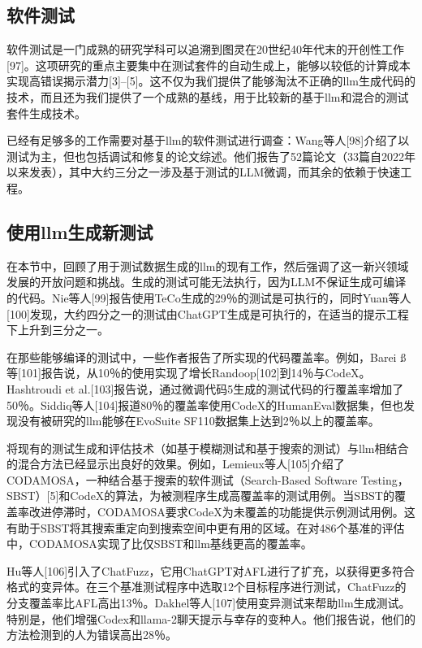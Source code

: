 \begin{translation}
\section{软件测试}

软件测试是一门成熟的研究学科可以追溯到图灵在20世纪40年代末的开创性工作[97]。这项研究的重点主要集中在测试套件的自动生成上，能够以较低的计算成本实现高错误揭示潜力[3]–[5]。这不仅为我们提供了能够淘汰不正确的llm生成代码的技术，而且还为我们提供了一个成熟的基线，用于比较新的基于llm和混合的测试套件生成技术。

已经有足够多的工作需要对基于llm的软件测试进行调查：Wang等人[98]介绍了以测试为主，但也包括调试和修复的论文综述。他们报告了52篇论文（33篇自2022年以来发表），其中大约三分之一涉及基于测试的LLM微调，而其余的依赖于快速工程。

\subsection{使用llm生成新测试}

在本节中，回顾了用于测试数据生成的llm的现有工作，然后强调了这一新兴领域发展的开放问题和挑战。生成的测试可能无法执行，因为LLM不保证生成可编译的代码。Nie等人[99]报告使用TeCo生成的29％的测试是可执行的，同时Yuan等人[100]发现，大约四分之一的测试由ChatGPT生成是可执行的，在适当的提示工程下上升到三分之一。

在那些能够编译的测试中，一些作者报告了所实现的代码覆盖率。例如，Barei ß等[101]报告说，从10％的使用实现了增长Randoop[102]到14％与CodeX。Hashtroudi et al.[103]报告说，通过微调代码5生成的测试代码的行覆盖率增加了50％。Siddiq等人[104]报道80％的覆盖率使用CodeX的HumanEval数据集，但也发现没有被研究的llm能够在EvoSuite SF110数据集上达到2％以上的覆盖率。

将现有的测试生成和评估技术（如基于模糊测试和基于搜索的测试）与llm相结合的混合方法已经显示出良好的效果。例如，Lemieux等人[105]介绍了CODAMOSA，一种结合基于搜索的软件测试（Search-Based Software Testing，SBST）[5]和CodeX的算法，为被测程序生成高覆盖率的测试用例。当SBST的覆盖率改进停滞时，CODAMOSA要求CodeX为未覆盖的功能提供示例测试用例。这有助于SBST将其搜索重定向到搜索空间中更有用的区域。在对486个基准的评估中，CODAMOSA实现了比仅SBST和llm基线更高的覆盖率。

Hu等人[106]引入了ChatFuzz，它用ChatGPT对AFL进行了扩充，以获得更多符合格式的变异体。在三个基准测试程序中选取12个目标程序进行测试，ChatFuzz的分支覆盖率比AFL高出13％。Dakhel等人[107]使用变异测试来帮助llm生成测试。特别是，他们增强Codex和llama-2聊天提示与幸存的变种人。他们报告说，他们的方法检测到的人为错误高出28％。


\end{translation}
